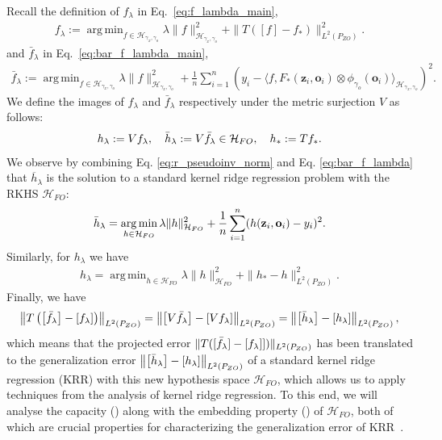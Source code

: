 \documentclass[11pt]{article}
\newcommand{\bz}{\mathbf z}
\newcommand{\bo}{\mathbf o}
\newcommand{\calH}{\mathcal{H}}
\newcommand{\0}{\mathbf{0}}
\DeclareMathOperator*{\argmin}{arg\,min}
\begin{document}
\begin{appendix}
Recall the definition of $f_{\lambda}$ in Eq.~\eqref{eq:f_lambda_main}, 
\begin{align}
    \label{eq:f_lambda}
        f_{\lambda} := \argmin_{f\in \calH_{\gamma_x,\gamma_o}}\lambda\|f\|^2_{\calH_{\gamma_x,\gamma_o}} + \|T([f] - f_{\ast})\|^2_{L^2(P_{ZO})}. 
    \end{align}
and $\bar{f}_{\lambda}$ in Eq.~\eqref{eq:bar_f_lambda_main}, 
\begin{align}
\label{eq:bar_f_lambda}
    \bar{f}_{\lambda}:= \argmin_{f\in \calH_{\gamma_x,\gamma_o}} \lambda \|f\|^2_{\calH_{\gamma_x,\gamma_o}} + \frac{1}{n}\sum_{i=1}^{n}(y_i - \langle f, F_{\ast}(\bz_i, \bo_i)\otimes \phi_{\gamma_o}(\bo_i)\rangle_{\calH_{\gamma_x,\gamma_o}})^2.
\end{align}
We define the images of $f_{\lambda}$ and $\bar{f}_{\lambda}$ respectively under the metric surjection $V$ as follows:
\begin{align*}
    h_{\lambda} := Vf_{\lambda}, \quad \Bar{h}_{\lambda} := V\Bar{f}_{\lambda} \in \calH_{FO},\quad h_{\ast} := Tf_{\ast}.
\end{align*}
We observe by combining Eq. \eqref{eq:r_pseudoinv_norm} and Eq. \eqref{eq:bar_f_lambda} that $\overline{h}_{\lambda}$ is the solution to a standard kernel ridge regression problem with the RKHS $\calH_{FO}$:
\begin{align}\label{eq:bhl_bvfl}
    \Bar{h}_{\lambda} = \argmin_{h\in \calH_{FO}}\lambda \|h\|_{\calH_{FO}}^2 + \frac{1}{n}\sum_{i=1}^{n}(h(\bz_i, \bo_i) - y_i)^2 . 
\end{align}
Similarly, for $h_\lambda$ we have 
\begin{align}\label{eq:hat_bhl_bvfl}
    h_{\lambda} = \argmin_{h\in \calH_{FO}} \lambda \|h\|^2_{\calH_{FO}} + \|h_{\ast} - h\|^2_{L^2(P_{ZO})}.
\end{align} 
Finally, we have 
\begin{align}\label{eq:error_translate}
    \left\|T\left(\left[\Bar{f}_{\lambda} \right] - [f_{\lambda}]\right)\right\|_{L^2(P_{ZO})} = \left\| \left[V \Bar{f}_{\lambda}\right] - [V f_{\lambda}] \right\|_{L^2(P_{ZO})} = \left\|\left[\Bar{h}_{\lambda} \right] - \left[h_{\lambda}\right]\right\|_{L^2(P_{ZO})},
\end{align}
which means that the projected error $\|T([\Bar{f}_{\lambda}] -[f_{\lambda}]])\|_{L^2(P_{ZO})}$ has been translated to the generalization error $\left\|\left[\Bar{h}_{\lambda} \right] - [h_{\lambda}]\right\|_{L^2(P_{ZO})}$ of a standard kernel ridge regression (KRR) with this new hypothesis space $\calH_{FO}$, which allows us to apply techniques from the analysis of kernel ridge regression. To this end, we will analyse the capacity () along with the embedding property () of $\calH_{FO}$, both of which are crucial properties for characterizing the generalization error of KRR~\citep{fischer2020sobolev}. 


\end{appendix}
\end{document}
